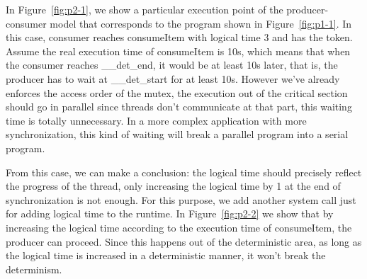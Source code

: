\documentclass{sig-alternate}
\begin{document}
In Figure~\ref{fig:p2-1}, we show a particular execution point of the producer-consumer model that corresponds to the program shown in Figure~\ref{fig:p1-1}. In this case, consumer reaches consumeItem with logical time 3 and has the token. Assume the real execution time of consumeItem is 10s, which means that when the consumer reaches \_\_det\_end, it would be at least 10s later, that is, the producer has to wait at \_\_det\_start for at least 10s. However we've already enforces the access order of the mutex, the execution out of the critical section should go in parallel since threads don't communicate at that part, this waiting time is totally unnecessary. In a more complex application with more synchronization, this kind of waiting will break a parallel program into a serial program.

From this case, we can make a conclusion: the logical time should precisely reflect the progress of the thread, only increasing the logical time by 1 at the end of synchronization is not enough. For this purpose, we add another system call just for adding logical time to the runtime. In Figure~\ref{fig:p2-2} we show that by increasing the logical time according to the execution time of consumeItem, the producer can proceed. Since this happens out of the deterministic area, as long as the logical time is increased in a deterministic manner, it won't break the determinism.
\end{document}
